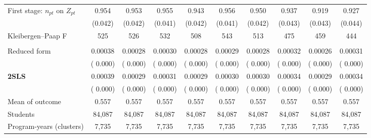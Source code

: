 \begin{tabular}{l*{9}{c}}
First stage: \(n_{pt}\) on \(Z_{pt}\) &  0.954\sym{***} &  0.953\sym{***} &  0.955\sym{***} &  0.943\sym{***} &  0.956\sym{***} &  0.950\sym{***} &  0.937\sym{***} &  0.919\sym{***} &  0.927\sym{***} \\
 & (0.042) & (0.042) & (0.041) & (0.042) & (0.041) & (0.042) & (0.043) & (0.043) & (0.044) \\
Kleibergen--Paap F &    525 &    526 &    532 &    508 &    543 &    513 &    475 &    459 &    444 \\
\addlinespace
\multicolumn{10}{l}{Graduation from any higher-education institution, 8y} \\
\quad Reduced form &  0.00038\sym{***} &  0.00028\sym{**} &  0.00030\sym{**} &  0.00028\sym{**} &  0.00029\sym{**} &  0.00028\sym{**} &  0.00032\sym{**} &  0.00026\sym{**} &  0.00031\sym{**} \\
 & ( 0.000) & ( 0.000) & ( 0.000) & ( 0.000) & ( 0.000) & ( 0.000) & ( 0.000) & ( 0.000) & ( 0.000) \\
\quad \textbf{2SLS} &  0.00039\sym{***} &  0.00029\sym{**} &  0.00031\sym{**} &  0.00029\sym{**} &  0.00030\sym{**} &  0.00030\sym{**} &  0.00034\sym{**} &  0.00029\sym{**} &  0.00034\sym{**} \\
 & ( 0.000) & ( 0.000) & ( 0.000) & ( 0.000) & ( 0.000) & ( 0.000) & ( 0.000) & ( 0.000) & ( 0.000) \\
Mean of outcome & 0.557 & 0.557 & 0.557 & 0.557 & 0.557 & 0.557 & 0.557 & 0.557 & 0.557 \\
Students &    84,087 &    84,087 &    84,087 &    84,087 &    84,087 &    84,087 &    84,087 &    84,087 &    84,087 \\
Program-years (clusters) &  7,735 &  7,735 &  7,735 &  7,735 &  7,735 &  7,735 &  7,735 &  7,735 &  7,735 \\
\bottomrule
\end{tabular}

